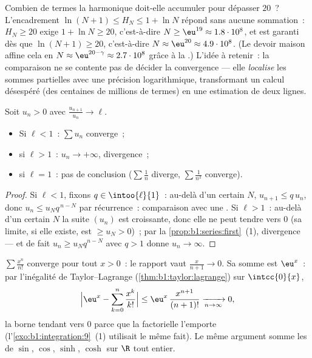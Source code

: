 \begin{example}\label{ex:b1:series:harmonicstack}
Combien de termes la  harmonique doit-elle accumuler pour
dépasser $20$~? L'encadrement $\ln(N+1) \leq H_N \leq 1 + \ln N$
répond sans aucune sommation~: $H_N \geq 20$ exige $1 + \ln N \geq
20$, c'est-à-dire $N \geq \eu^{19} \approx 1.8\cdot10^{8}$, et est
garanti dès que $\ln(N + 1) \geq 20$, c'est-à-dire $N \approx
\eu^{20} \approx 4.9\cdot10^{8}$. (Le devoir maison affine cela en
$N \approx \eu^{20 - \gamma} \approx 2.7\cdot10^{8}$ grâce à la
.) L'idée à retenir~: la comparaison
 ne se contente pas de décider la convergence --- elle
\emph{localise} les sommes partielles avec une précision
logarithmique, transformant un calcul désespéré (des centaines de
millions de termes) en une estimation de deux lignes.
\end{example}

\begin{theorem}\label{thm:b1:series:ratio}
Soit $u_n > 0$ avec $\frac{u_{n+1}}{u_n} \to \ell$.
\begin{itemize}
  \item Si $\ell < 1$~: $\sum u_n$ converge~;
  \item si $\ell > 1$~: $u_n \to +\infty$, divergence~;
  \item si $\ell = 1$~: pas de conclusion ($\sum \frac1n$ diverge, $\sum
        \frac{1}{n^2}$ converge).
\end{itemize}
\end{theorem}

\begin{proof}
Si $\ell < 1$, fixons $q \in \intoo{\ell}{1}$~: au-delà d'un certain
$N$, $u_{n+1} \leq q\,u_n$, donc $u_n \leq u_N q^{\,n-N}$ par
récurrence~: comparaison avec une . Si $\ell > 1$~:
au-delà d'un certain $N$ la suite $(u_n)$ est croissante, donc elle
ne peut tendre vers $0$ (sa limite, si elle existe, est $\geq u_N >
0$)~; par la \cref{prop:b1:series:first}~(1), divergence --- et de fait
$u_n \geq u_N q^{n-N}$ avec $q > 1$ donne $u_n \to \infty$.
\end{proof}

\begin{example}\label{ex:b1:series:ratio}
$\sum \frac{x^n}{n!}$ converge pour tout $x > 0$~: le rapport vaut
$\frac{x}{n+1} \to 0$. Sa somme est $\eu^x$~: par l'inégalité de
Taylor--Lagrange (\cref{thm:b1:taylor:lagrange}) sur $\intcc{0}{x}$,
\[
\Bigl| \eu^x - \sum_{k=0}^{n} \frac{x^k}{k!} \Bigr|
\leq \eu^{x}\, \frac{x^{n+1}}{(n+1)!} \xrightarrow[n\to\infty]{} 0 ,
\]
la borne tendant vers $0$ parce que la factorielle l'emporte
(l'\cref{exo:b1:integration:9}~(1) utilisait le même fait). Le même
argument somme les  de $\sin$, $\cos$, $\sinh$, $\cosh$ sur
$\R$ tout entier.
\end{example}

